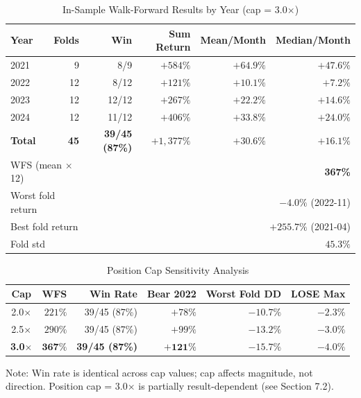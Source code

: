 \begin{table}[htbp]
\centering
\caption{In-Sample Walk-Forward Results by Year (cap = 3.0$\times$)}
\label{tab:is_results}
\begin{tabular}{lrrrrr}
\toprule
Year & Folds & Win & Sum Return & Mean/Month & Median/Month \\
\midrule
2021 &  9 & 8/9  & $+584\%$  & $+64.9\%$ & $+47.6\%$ \\
2022 & 12 & 8/12 & $+121\%$  & $+10.1\%$ & $+7.2\%$  \\
2023 & 12 & 12/12 & $+267\%$ & $+22.2\%$ & $+14.6\%$ \\
2024 & 12 & 11/12 & $+406\%$ & $+33.8\%$ & $+24.0\%$ \\
\midrule
\textbf{Total} & \textbf{45} & \textbf{39/45 (87\%)} & $+1{,}377\%$ & $+30.6\%$ & $+16.1\%$ \\
\midrule
\multicolumn{2}{l}{WFS (mean $\times$ 12)} & \multicolumn{4}{r}{\textbf{367\%}} \\
\multicolumn{2}{l}{Worst fold return} & \multicolumn{4}{r}{$-4.0\%$ (2022-11)} \\
\multicolumn{2}{l}{Best fold return} & \multicolumn{4}{r}{$+255.7\%$ (2021-04)} \\
\multicolumn{2}{l}{Fold std} & \multicolumn{4}{r}{$45.3\%$} \\
\bottomrule
\end{tabular}
\end{table}

\begin{table}[htbp]
\centering
\caption{Position Cap Sensitivity Analysis}
\label{tab:cap_sensitivity}
\begin{tabular}{crrrrr}
\toprule
Cap & WFS & Win Rate & Bear 2022 & Worst Fold DD & LOSE Max \\
\midrule
2.0$\times$ & $221\%$ & 39/45 (87\%) & $+78\%$  & $-10.7\%$ & $-2.3\%$ \\
2.5$\times$ & $290\%$ & 39/45 (87\%) & $+99\%$  & $-13.2\%$ & $-3.0\%$ \\
\textbf{3.0$\times$} & $\mathbf{367\%}$ & \textbf{39/45 (87\%)} & $\mathbf{+121\%}$ & $-15.7\%$ & $-4.0\%$ \\
\bottomrule
\end{tabular}
\begin{tablenotes}
\small
\item Note: Win rate is identical across cap values; cap affects magnitude, not direction.
Position cap = 3.0$\times$ is partially result-dependent (see Section 7.2).
\end{tablenotes}
\end{table}

